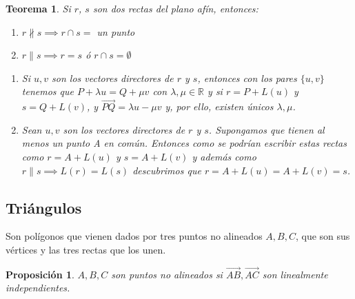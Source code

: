 \documentclass[11pt, a4paper, titlepage]{article}
\makeatletter
\renewenvironment{proof}[1][\proofname] {\vspace{-15pt}\par\pushQED{\qed}\normalfont\topsep6\p@\@plus6\p@\relax\trivlist\item[\hskip\labelsep\it#1\@addpunct{.}]\ignorespaces}{\popQED\endtrivlist\@endpefalse}
\newcommand{\R}{\mathbb{R}}
\theoremstyle{theorem-style}
\newtheorem*{nth}{Teorema}
\newtheorem*{nprop}{Proposición}
\theoremstyle{definition-style}
\newtheorem*{ndef}{Definición}
\theoremstyle{remark-style}
\theoremstyle{example-style}
\newenvironment{nlist}
{\begin{enumerate}
\renewcommand\labelenumi{(\emph{\roman{enumi})}}}
{\end{enumerate}}
\makeatother
\begin{document}
\begin{nth}
	Si $r$, $s$ son dos rectas del plano afín, entonces:
	\begin{nlist}
	\item $r \nparallel s\implies r \cap s = $ un punto
	\item $r \parallel s \implies r = s$ ó $r \cap s =  \emptyset$
\end{nlist}
\begin{proof}
	\begin{nlist}
	\item Si $u,v$ son los vectores directores de $r$ y $s$, entonces con los pares $\{u,v\}$ tenemos que $P+\lambda u = Q + \mu v$ con $\lambda, \mu \in \R$
y si $r = P +L(u)$ y $s=Q+L(v)$, y $\overrightarrow{PQ} = \lambda u - \mu v $ y, por ello, existen únicos $\lambda, \mu$.
\item Sean $u,v$ son los vectores directores de $r$ y $s$. Supongamos que tienen al menos un punto  A en común. Entonces como se podrían escribir estas rectas como $r = A +L(u)$ y $s=A+L(v)$ y además como $r \parallel s \implies L(r)=L(s)$ descubrimos que $r = A +L(u)=A+L(v) = s$.
\end{nlist}
\end{proof}
\end{nth}




\subsection{Triángulos}
Son polígonos que vienen dados por tres puntos no alineados $A,B,C$, que son sus vértices y las tres rectas que los unen.



\begin{nprop}
$A,B,C$ son puntos no alineados si $\vec{AB},\vec{AC}$ son linealmente independientes.
	
	
\end{nprop}

\end{document}
